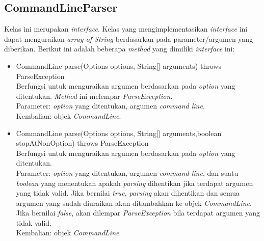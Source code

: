 \subsection{CommandLineParser}
\label{subsec:commandlineparser}
Kelas ini merupakan \textit{interface}. Kelas yang mengimplementasikan \textit{interface} ini dapat menguraikan \textit{array of String} berdasarkan pada parameter/argumen yang diberikan. Berikut ini adalah beberapa \textit{method} yang dimiliki \textit{interface} ini: 
\begin{itemize}
\item CommandLine parse(Options options, String[] arguments) throws ParseException\\
Berfungsi untuk menguraikan argumen berdasarkan pada \textit{option} yang ditentukan. \textit{Method} ini melempar \textit{ParseException}.\\
Parameter: \textit{option} yang ditentukan, argumen \textit{command line}.\\
Kembalian: objek \textit{CommandLine}.

\item CommandLine parse(Options options, String[] arguments,boolean stopAtNonOption) throws ParseException\\
Berfungsi untuk menguraikan argumen berdasarkan pada \textit{option} yang ditentukan.\\
Parameter: \textit{option} yang ditentukan, argumen \textit{command line}, dan suatu \textit{boolean} yang menentukan apakah \textit{parsing} dihentikan jika terdapat argumen yang tidak valid. Jika bernilai \textit{true}, \textit{parsing} akan dihentikan dan semua argumen yang sudah diuraikan akan ditambahkan ke objek \textit{CommandLine}. Jika bernilai \textit{false}, akan dilempar \textit{ParseException} bila terdapat argumen yang tidak valid.
\\
Kembalian: objek \textit{CommandLine}.
\end{itemize}

